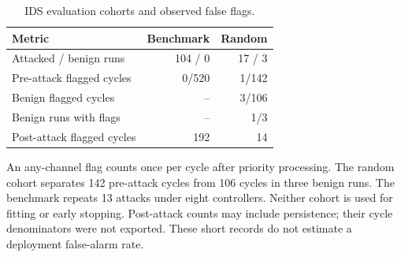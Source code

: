\begin{table}[!htbp]
\centering
\caption{IDS evaluation cohorts and observed false flags.}\label{tab:core-detector}
{\fontsize{8}{9.2}\selectfont\setlength{\tabcolsep}{5pt}
\begin{tabular*}{\linewidth}{@{\extracolsep{\fill}}lrr@{}}
\toprule
Metric & Benchmark & Random \\
\midrule
Attacked / benign runs & 104 / 0 & 17 / 3 \\
Pre-attack flagged cycles & 0/520 & 1/142 \\
Benign flagged cycles & -- & 3/106 \\
Benign runs with flags & -- & 1/3 \\
Post-attack flagged cycles & 192 & 14 \\
\bottomrule
\end{tabular*}}
\par\smallskip
\begin{minipage}{\linewidth}\raggedright
{\fontsize{7.5}{8.5}\selectfont An any-channel flag counts once per cycle after priority processing. The random cohort separates 142 pre-attack cycles from 106 cycles in three benign runs. The benchmark repeats 13 attacks under eight controllers. Neither cohort is used for fitting or early stopping. Post-attack counts may include persistence; their cycle denominators were not exported. These short records do not estimate a deployment false-alarm rate.\par}
\end{minipage}
\end{table}
